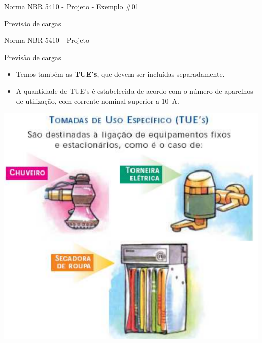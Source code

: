 \begin{frame}{Norma NBR 5410 - Projeto - Exemplo \#01}
	\begin{block}{Previsão de cargas}
		\centering
	\end{block}
\end{frame}


\begin{frame}{Norma NBR 5410 - Projeto}
	\begin{block}{Previsão de cargas}
		\begin{itemize}
			\item Temos também as \textbf{TUE's}, que devem ser incluídas separadamente.
			\item A quantidade de TUE's é estabelecida de acordo com o número de aparelhos de utilização, com corrente nominal superior a \SI{10}{\ampere}.
		\end{itemize}
	\end{block}

	\centering
	\includegraphics[width=0.5\linewidth]{Figuras/Ch02/fig6}

\end{frame}


